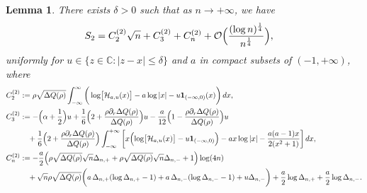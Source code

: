 \documentclass[reqno]{amsart}
\newcommand{\1}{\mathds{1}}
\newcommand{\C}{\mathds{C}}
\numberwithin{equation}{section}
\newtheorem{lemma}[theorem]{Lemma}
\theoremstyle{definition}
\begin{document}
\begin{lemma}\label{lemma:Analysis of S2}
There exists $\delta>0$ such that as $n\to+\infty$, we have  
\begin{align*}
S_2&=
C_2^{(2)}\sqrt{n}
+C_3^{(2)}
+C_n^{(2)}
+\mathcal{O}\Bigl(\frac{(\log n)^{\frac{1}{4}}}{n^{\frac{1}{4}}}\Bigr), 
\end{align*}
uniformly for $u\in\{z\in\C:|z-x|\leq \delta\}$ and $a$ in compact subsets of $(-1,+\infty)$, where 
\begin{align*}
C_2^{(2)}
&:=
\rho\sqrt{\Delta Q(\rho)}
\int_{-\infty}^{\infty}
\bigg(\log\bigl[\mathcal{H}_{a,u}(x)\bigr]
-a\log|x|-u\mathbf{1}_{(-\infty,0)}(x)
\bigg)
\,dx,
\\
C_3^{(2)}
&:=
-
\Bigl(\alpha+\frac{1}{2}\Bigr)u
+
\frac{1}{6}\Bigl(2+\frac{\rho\partial_r\Delta Q(\rho)}{\Delta Q(\rho)}\Bigr)u
-
\frac{a}{12}\Bigl(1-\frac{\rho\partial_r\Delta Q(\rho)}{\Delta Q(\rho)}\Bigr)u
\\
&\quad 
+\frac{1}{6}\Bigl(2+\frac{\rho\partial_r\Delta Q(\rho)}{\Delta Q(\rho)}\Bigr)
\int_{-\infty}^{+\infty}
\bigg[
x\Bigl(\log\bigl[\mathcal{H}_{a,u}(x)\bigr] 
- u\mathbf{1}_{(-\infty,0)}
\Big)
-ax\log|x| 
-\frac{a(a-1)x}{2(x^2+1)}
\bigg]\,dx,
\nonumber
\\
C_n^{(2)}
&:=
-\frac{a}{2}\Bigl(\rho\sqrt{\Delta Q(\rho)}\sqrt{n}\Delta_{n,+}
+\rho\sqrt{\Delta Q(\rho)}\sqrt{n}\Delta_{n,-}
+1\Bigr)\log(4n)
\\
&\quad
+
\sqrt{n}\rho\sqrt{\Delta Q(\rho)}
\bigg( 
a\,\Delta_{n,+}(\log \Delta_{n,+}-1)
+a\, \Delta_{n,-}(\log \Delta_{n,-}-1)
+u\Delta_{n,-}
\bigg)
+\frac{a}{2}\log\Delta_{n,+}
+\frac{a}{2}\log\Delta_{n,-}. 
\end{align*}
\end{lemma}
\end{document}
